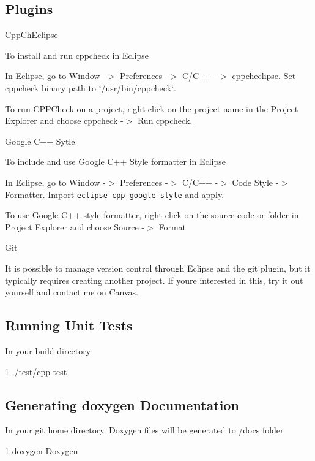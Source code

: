 \subsection*{Plugins}


\begin{DoxyItemize}
\item Cpp\+Ch\+Eclipse

To install and run cppcheck in Eclipse
\begin{DoxyEnumerate}
\item In Eclipse, go to Window -\/$>$ Preferences -\/$>$ C/\+C++ -\/$>$ cppcheclipse. Set cppcheck binary path to \char`\"{}/usr/bin/cppcheck\char`\"{}.
\item To run C\+P\+P\+Check on a project, right click on the project name in the Project Explorer and choose cppcheck -\/$>$ Run cppcheck.
\end{DoxyEnumerate}
\item Google C++ Sytle

To include and use Google C++ Style formatter in Eclipse
\begin{DoxyEnumerate}
\item In Eclipse, go to Window -\/$>$ Preferences -\/$>$ C/\+C++ -\/$>$ Code Style -\/$>$ Formatter. Import \href{https://raw.githubusercontent.com/google/styleguide/gh-pages/eclipse-cpp-google-style.xml}{\tt eclipse-\/cpp-\/google-\/style} and apply.
\item To use Google C++ style formatter, right click on the source code or folder in Project Explorer and choose Source -\/$>$ Format
\end{DoxyEnumerate}
\item Git

It is possible to manage version control through Eclipse and the git plugin, but it typically requires creating another project. If you\textquotesingle{}re interested in this, try it out yourself and contact me on Canvas.
\end{DoxyItemize}

\subsection*{Running Unit Tests}

In your build directory 
\begin{DoxyCode}
1 ./test/cpp-test
\end{DoxyCode}


\subsection*{Generating doxygen Documentation}

In your git home directory. Doxygen files will be generated to /docs folder 
\begin{DoxyCode}
1 doxygen Doxygen
\end{DoxyCode}
 